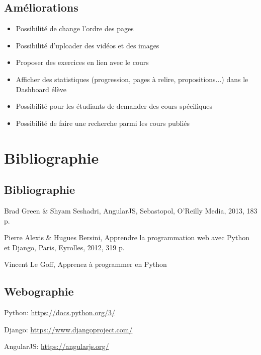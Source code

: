 \documentclass[letterpaper,10pt,oneside]{sphinxmanual}
\begin{document}
\section{Améliorations}
\label{bugs:ameliorations}\begin{itemize}
\item {} 
Possibilité de change l'ordre des pages

\item {} 
Possibilité d'uploader des vidéos et des images

\item {} 
Proposer des exercices en lien avec le cours

\item {} 
Afficher des statistiques (progression, pages à relire, propositions...) dans le Dashboard élève

\item {} 
Possibilité pour les étudiants de demander des cours spécifiques

\item {} 
Possibilité de faire une recherche parmi les cours publiés

\end{itemize}


\chapter{Bibliographie}
\label{bibliographie::doc}\label{bibliographie:bibliographie}

\section{Bibliographie}
\label{bibliographie:id1}
Brad Green \& Shyam Seshadri, AngularJS, Sebastopol, O’Reilly Media, 2013, 183 p.

Pierre Alexis \& Hugues Bersini, Apprendre la programmation web avec Python et Django, Paris, Eyrolles, 2012, 319 p.

Vincent Le Goff, Apprenez à programmer en Python


\section{Webographie}
\label{bibliographie:webographie}
Python: \href{https://docs.python.org/3/}{https://docs.python.org/3/}

Django: \href{https://www.djangoproject.com/}{https://www.djangoproject.com/}

AngularJS: \href{https://angularjs.org/}{https://angularjs.org/}
\end{document}
